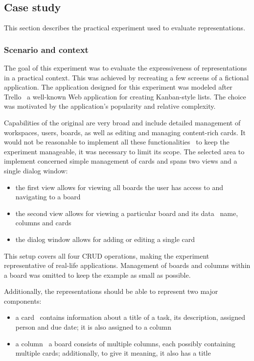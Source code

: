 \subsection{Case study}\label{subsec:case-study}
This section describes the practical experiment used to evaluate representations.

\subsubsection{Scenario and context}
The goal of this experiment was to evaluate the expressiveness of representations in a practical context.
This was achieved by recreating a few screens of a fictional application.
The application designed for this experiment was modeled after Trello \textendash\ a well-known Web application for creating Kanban-style lists.
The choice was motivated by the application's popularity and relative complexity.

Capabilities of the original are very broad and include detailed management of workspaces, users, boards, as well as editing and managing content-rich cards.
It would not be reasonable to implement all these functionalities \textendash\ to keep the experiment manageable, it was necessary to limit its scope.
The selected area to implement concerned simple management of cards and spans two views and a single dialog window:
\begin{itemize}
    \item the first view allows for viewing all boards the user has access to and navigating to a board
    \item the second view allows for viewing a particular board and its data \textendash\ name, columns and cards
    \item the dialog window allows for adding or editing a single card
\end{itemize}
This setup covers all four CRUD operations, making the experiment representative of real-life applications.
Management of boards and columns within a board was omitted to keep the example as small as possible.

Additionally, the representations should be able to represent two major components:
\begin{itemize}
    \item a card \textendash\ contains information about a title of a task, its description, assigned person and due date; it is also assigned to a column
    \item a column \textendash\ a board consists of multiple columns, each possibly containing multiple cards; additionally, to give it meaning, it also has a title
\end{itemize}

